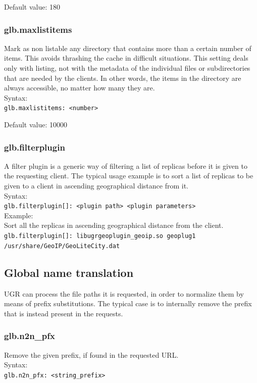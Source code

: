 \documentclass[12pt]{article} %
\begin{document}
Default value: 180

\subsubsection{glb.maxlistitems}
Mark as non listable any directory that contains more than a certain number of items. This avoids thrashing the cache in difficult situations. This setting deals only with listing, not with the metadata of the individual files or subdirectories that are needed by the clients. In other words, the items in the directory are always accessible, no matter how many they are.\\
Syntax:\\
\lstinline"glb.maxlistitems: <number>"


Default value: 10000

\subsubsection{glb.filterplugin}
A filter plugin is a generic way of filtering a list of replicas before it is given to the requesting client.
The typical usage example is to sort a list of replicas to be given to a client in ascending geographical distance from it.
\\
Syntax:\\
\lstinline"glb.filterplugin[]: <plugin path> <plugin parameters>"
\\
Example:\\
Sort all the replicas in ascending geographical distance from the client.
\lstinline"glb.filterplugin[]: libugrgeoplugin_geoip.so geoplug1 /usr/share/GeoIP/GeoLiteCity.dat"


\subsection{\label{globalxlation}Global name translation}

UGR can process the file paths it is requested, in order to normalize them by means of prefix substitutions. The typical case is to internally remove the prefix that is instead present in the requests.

\subsubsection{glb.n2n\_pfx}

Remove the given prefix, if found in the requested URL.\\
Syntax:\\
\lstinline"glb.n2n_pfx: <string_prefix>"
\end{document}
